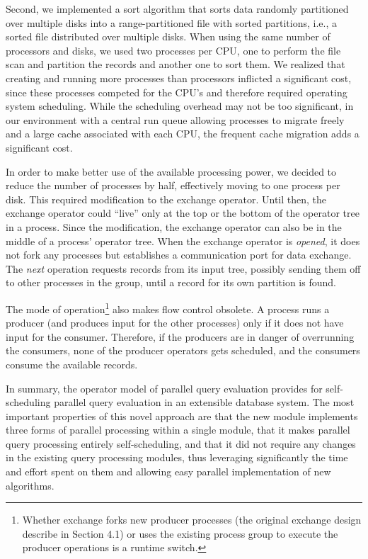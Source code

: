 \documentclass[a4paper,12pt,notitlepage,twoside,openright]{article}
\begin{document}
Second, we implemented a sort algorithm that sorts
data randomly partitioned over multiple disks into a range-partitioned
file with sorted partitions, i.e., a sorted file distributed
over multiple disks. When using the same number
of processors and disks, we used two processes per CPU,
one to perform the file scan and partition the records and
another one to sort them. We realized that creating and
running more processes than processors inflicted a significant
cost, since these processes competed for the CPU's and
therefore required operating system scheduling. While the
scheduling overhead may not be too significant, in our
environment with a central run queue allowing processes to
migrate freely and a large cache associated with each CPU,
the frequent cache migration adds a significant cost.

In order to make better use of the available processing
power, we decided to reduce the number of processes
by half, effectively moving to one process per disk. This
required modification to the exchange operator. Until then,
the exchange operator could ``live'' only at the top or the
bottom of the operator tree in a process. Since the modification,
the exchange operator can also be in the middle of
a process' operator tree. When the exchange operator is
\emph{opened}, it does not fork any processes but establishes a
communication port for data exchange. The \emph{next} operation
requests records from its input tree, possibly sending them
off to other processes in the group, until a record for its
own partition is found.

The mode of operation\footnote{%
Whether exchange forks new producer processes (the original
exchange design describe in Section 4.1) or uses the existing
process group to execute the producer operations is a runtime
switch.%
} also makes flow control
obsolete. A process runs a producer (and produces input
for the other processes) only if it does not have input for
the consumer. Therefore, if the producers are in danger of
overrunning the consumers, none of the producer operators
gets scheduled, and the consumers consume the available
records.

In summary, the operator model of parallel query
evaluation provides for self-scheduling parallel query evaluation
in an extensible database system. The most important
properties of this novel approach are that the new module
implements three forms of parallel processing within a single
module, that it makes parallel query processing entirely
self-scheduling, and that it did not require any changes in
the existing query processing modules, thus leveraging significantly
the time and effort spent on them and allowing
easy parallel implementation of new algorithms.
\end{document}
